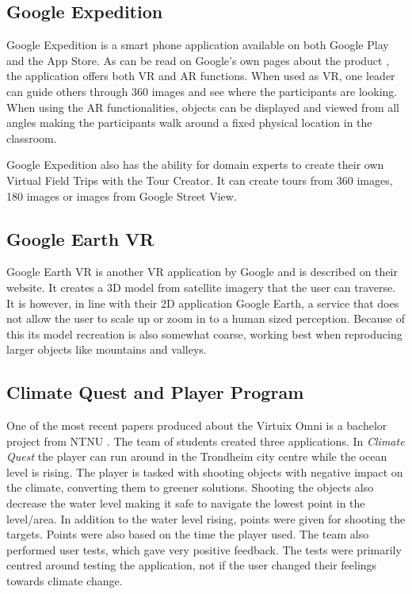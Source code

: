    \subsection{Google Expedition}
        Google Expedition is a smart phone application available on both Google Play and the App Store. As can be read on Google's own pages about the product \cite{google_expeditions}, the application offers both VR and AR functions. When used as VR, one leader can guide others through 360 images and see where the participants are looking. When using the AR functionalities, objects can be displayed and viewed from all angles making the participants walk around a fixed physical location in the classroom.
        
        Google Expedition also has the ability for domain experts to create their own Virtual Field Trips with the Tour Creator. It can create tours from 360 images, 180 images or images from Google Street View.
    
    \subsection{Google Earth VR}
        Google Earth VR is another VR application by Google and is described on their website\cite{google_earth_vr}. It creates a 3D model from satellite imagery that the user can traverse. It is however, in line with their 2D application Google Earth, a service that does not allow the user to scale up or zoom in to a human sized perception. Because of this its model recreation is also somewhat coarse, working best when reproducing larger objects like mountains and valleys.
    
    \subsection{Climate Quest and Player Program}
        One of the most recent papers produced about the Virtuix Omni is a bachelor project from NTNU \cite{bachelor}. The team of students created three applications. In \emph{Climate Quest} the player can run around in the Trondheim city centre while the ocean level is rising. The player is tasked with shooting objects with negative impact on the climate, converting them to greener solutions. Shooting the objects also decrease the water level making it safe to navigate the lowest point in the level/area. In addition to the water level rising, points were given for shooting the targets. Points were also based on the time the player used. The team also performed user tests, which gave very positive feedback. The tests were primarily centred around testing the application, not if the user changed their feelings towards climate change.
        

